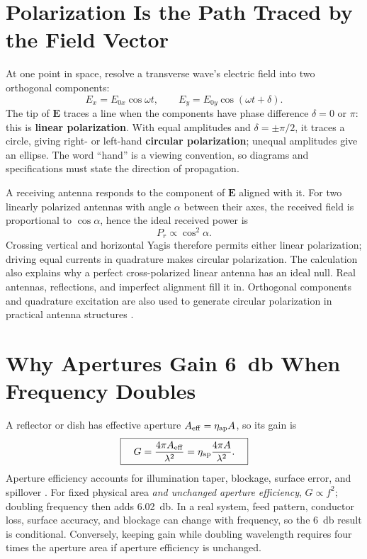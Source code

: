 \section{Polarization Is the Path Traced by the Field Vector}
\label{sec:polarization}
At one point in space, resolve a transverse wave's electric field into two
orthogonal components:
\[
 E_x=E_{0x}\cos\omega t,\qquad
 E_y=E_{0y}\cos(\omega t+\delta).
\]
The tip of \(\mathbf E\) traces a line when the components have phase difference
\(\delta=0\) or \(\pi\): this is \textbf{linear polarization}.  With equal
amplitudes and \(\delta=\pm\pi/2\), it traces a circle, giving right- or
left-hand \textbf{circular polarization}; unequal amplitudes give an ellipse.
The word ``hand'' is a viewing convention, so diagrams and specifications must
state the direction of propagation.

A receiving antenna responds to the component of \(\mathbf E\) aligned with it.
For two linearly polarized antennas with angle \(\alpha\) between their axes,
the received field is proportional to \(\cos\alpha\), hence the ideal received
power is
\[
\boxed{\quad P_r\propto\cos^2\alpha.\quad}
\]
Crossing vertical and horizontal Yagis therefore permits either linear
polarization; driving equal currents in quadrature makes circular polarization.
The calculation also explains why a perfect cross-polarized linear antenna has
an ideal null.  Real antennas, reflections, and imperfect alignment fill it in.
Orthogonal components and quadrature excitation are also used to generate circular
polarization in practical antenna structures
\cite[pp.~397--398]{free2022rfmicrowave}.

\section{Why Apertures Gain \SI{6}{\decibel} When Frequency Doubles}
\label{sec:aperturegain}
A reflector or dish has effective aperture \(A_{\rm eff}=\eta_{\rm ap}A\), so its gain is
\[
\boxed{\quad G=\frac{4\pi A_{\rm eff}}{\lambda^2}
=\eta_{\rm ap}\frac{4\pi A}{\lambda^2}.\quad}
\]
Aperture efficiency accounts for illumination taper, blockage, surface error, and
spillover \cite[pp.~407--409]{free2022rfmicrowave}. For fixed physical area
\emph{and unchanged aperture efficiency}, \(G\propto f^2\); doubling frequency then
adds \SI{6.02}{\decibel}. In a real system, feed pattern, conductor loss, surface
accuracy, and blockage can change with frequency, so the \SI{6}{\decibel} result is
conditional. Conversely, keeping gain while doubling wavelength requires four times
the aperture area if aperture efficiency is unchanged.

